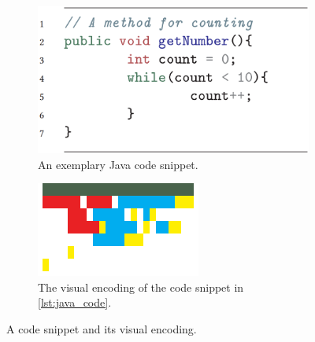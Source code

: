 \documentclass[%
class=scrreprt,
chapterprefix=false,%
open=right,%
twoside=true,%
paper=a4,%
logofile={Logo\_zentral\_farbig\_EN.png},%
thesistype=master,%
UKenglish,%
]{se2thesis}
\theoremstyle{definition}
\begin{document}
	\begin{figure}
		\begin{subfigure}[t]{0.48\textwidth}
			\centering
			\includegraphics[width=\textwidth]{img/visual_encoding_code.png}
			\caption{An exemplary Java code snippet.}
			\label{lst:java_code}
		\end{subfigure}
		\begin{subfigure}[t]{0.48\textwidth}
			\centering
			\includegraphics[width=\textwidth]{img/visual_encoding.png}
			\caption{The visual encoding of the code snippet in \autoref{lst:java_code}.}
			\label{fig:visual_encoding}
		\end{subfigure}
		\caption{A code snippet and its visual encoding.}
		\label{fig:visual_encoding_combined}
	\end{figure}
	
\end{document}
